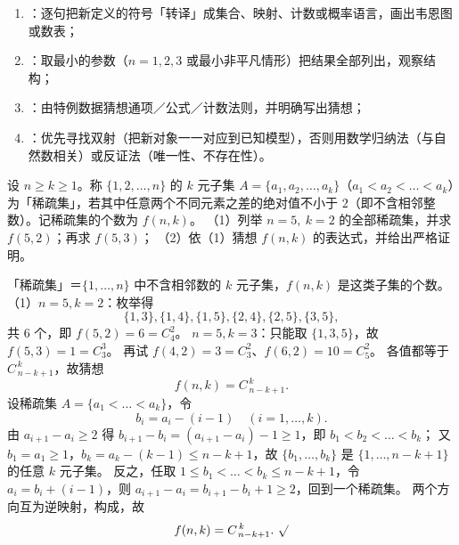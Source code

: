 \begin{explore}
\begin{method}[新定义情境题的四步破题流程]
\begin{enumerate}
  \item {}：逐句把新定义的符号「转译」成集合、映射、计数或概率语言，画出韦恩图或数表；
  \item {}：取最小的参数（$n=1,2,3$ 或最小非平凡情形）把结果全部列出，观察结构；
  \item {}：由特例数据猜想通项／公式／计数法则，并明确写出猜想；
  \item {}：优先寻找双射（把新对象一一对应到已知模型），否则用数学归纳法（与自然数相关）或反证法（唯一性、不存在性）。
\end{enumerate}
\end{method}

\begin{problem}
设 $n\ge k\ge1$。称 $\{1,2,\dots,n\}$ 的 $k$ 元子集 $A=\{a_1,a_2,\dots,a_k\}$（$a_1<a_2<\dots<a_k$）为「稀疏集」，若其中任意两个不同元素之差的绝对值不小于 $2$（即不含相邻整数）。记稀疏集的个数为 $f(n,k)$。
（1）列举 $n=5,\ k=2$ 的全部稀疏集，并求 $f(5,2)$；再求 $f(5,3)$；
（2）依（1）猜想 $f(n,k)$ 的表达式，并给出严格证明。
\end{problem}
\begin{solution}
「稀疏集」＝$\{1,\dots,n\}$ 中不含相邻数的 $k$ 元子集，$f(n,k)$ 是这类子集的个数。
（1）$n=5,k=2$：枚举得
\[
  \{1,3\},\{1,4\},\{1,5\},\{2,4\},\{2,5\},\{3,5\},
\]
共 $6$ 个，即 $f(5,2)=6=C_4^2$。
$n=5,k=3$：只能取 $\{1,3,5\}$，故 $f(5,3)=1=C_3^3$。
再试 $f(4,2)=3=C_3^2$、$f(6,2)=10=C_5^2$。
各值都等于 $C_{\,n-k+1}^{\,k}$，故猜想
\[
  f(n,k)=C_{\,n-k+1}^{\,k}.
\]
设稀疏集 $A=\{a_1<\dots<a_k\}$，令
\[
  b_i=a_i-(i-1)\quad(i=1,\dots,k).
\]
由 $a_{i+1}-a_i\ge2$ 得 $b_{i+1}-b_i=(a_{i+1}-a_i)-1\ge1$，即 $b_1<b_2<\dots<b_k$；
又 $b_1=a_1\ge1$，$b_k=a_k-(k-1)\le n-k+1$，故 $\{b_1,\dots,b_k\}$ 是 $\{1,\dots,n-k+1\}$ 的任意 $k$ 元子集。
反之，任取 $1\le b_1<\dots<b_k\le n-k+1$，令 $a_i=b_i+(i-1)$，则 $a_{i+1}-a_i=b_{i+1}-b_i+1\ge2$，回到一个稀疏集。
两个方向互为逆映射，构成，故
\[
  f(n,k)=C_{\,n-k+1}^{\,k}.\ \surd
\]
\end{solution}


\end{explore}
